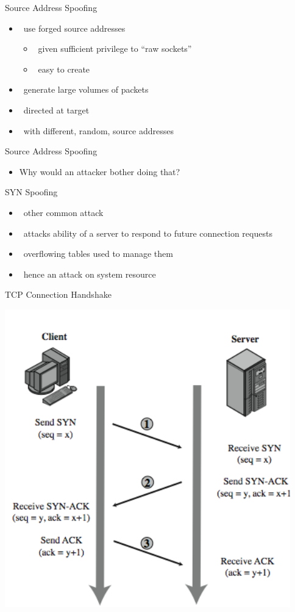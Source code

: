 \documentclass{beamer}
\begin{document}
\begin{frame}{Source Address Spoofing }
  \begin{itemize}
  \item  use forged source addresses 
    \begin{itemize}
    \item  given sufficient privilege to “raw sockets” 
    \item  easy to create 
    \end{itemize}
  \item  generate large volumes of packets 
  \item  directed at target 
  \item  with different, random, source addresses
  \end{itemize}
\end{frame}



\begin{frame}{Source Address Spoofing }
  \begin{itemize}
    \item Why would an attacker bother doing that?
  \end{itemize}
\end{frame}


\begin{frame}{SYN Spoofing }
  \begin{itemize}
  \item  other common attack 
  \item  attacks ability of a server to respond to future 
    connection requests 
  \item  overflowing tables used to manage them 
  \item  hence an attack on system resource
  \end{itemize}
\end{frame}


\begin{frame}{TCP Connection Handshake}
  \begin{center}
    \includegraphics[width=0.5\linewidth]{tcp_conn}
  \end{center}
\end{frame}
\end{document}
